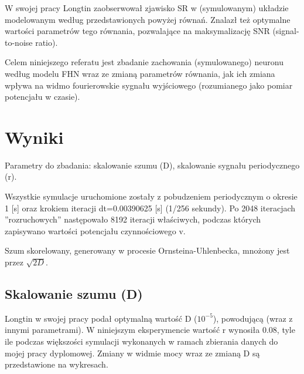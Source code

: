 \documentclass[12pt]{article}
\begin{document}
  W swojej pracy Longtin zaobserwował zjawisko SR w (symulowanym) układzie modelowanym według przedstawionych powyżej równań. Znalazł też optymalne wartości parametrów tego równania, pozwalające na maksymalizację SNR (signal-to-noise ratio).

  Celem niniejszego referatu jest zbadanie zachowania (symulowanego) neuronu według modelu FHN wraz ze zmianą parametrów równania, jak ich zmiana wpływa na widmo fourierowskie sygnału wyjściowego (rozumianego jako pomiar potencjału w czasie).

  \section{Wyniki}
  
  Parametry do zbadania: skalowanie szumu (D), skalowanie sygnału periodycznego (r).

  Wszystkie symulacje uruchomione zostały z pobudzeniem periodycznym o okresie 1 [s] oraz krokiem iteracji dt=0.00390625 [s] (1/256 sekundy). Po 2048 iteracjach ''rozruchowych'' następowało 8192 iteracji właściwych, podczas których zapisywano wartości potencjału czynnościowego v.

  Szum skorelowany, generowany w procesie Ornsteina-Uhlenbecka, mnożony jest przez $\sqrt{2D}$.


  \subsection{Skalowanie szumu (D)}

  Longtin w swojej pracy podał optymalną wartość D ($10^{-5}$), powodującą (wraz z innymi parametrami). W niniejszym eksperymencie wartość r wynosiła 0.08, tyle ile podczas większości symulacji wykonanych w ramach zbierania danych do mojej pracy dyplomowej. Zmiany w widmie mocy wraz ze zmianą D są przedstawione na wykresach.
\end{document}
